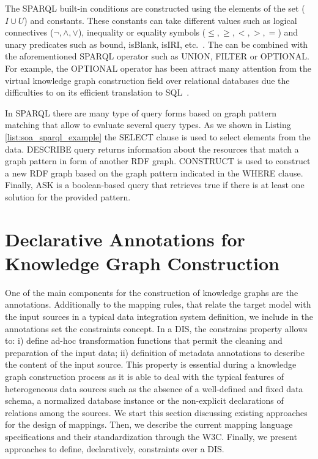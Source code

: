 \begin{table}[!ht]
\centering
\caption{Example of a SPARQL result-set}
\label{tab:soa_result_set}
\end{table}

The SPARQL built-in conditions are constructed using the elements of the set ($I \cup U$) and constants. These constants can take different values such as logical connectives ($\neg,\wedge,\vee $), inequality or equality symbols ($\leq,\geq,<,>,= $) and unary predicates such as bound, isBlank, isIRI, etc.~\citep{SPARQL}. The can be combined with the aforementioned SPARQL operator such as UNION, FILTER or OPTIONAL. For example, the OPTIONAL operator has been attract many attention from the virtual knowledge graph construction field over relational databases due the difficulties to on its efficient translation to SQL~\citep{xiao2018efficient}.

In SPARQL there are many type of query forms based on graph pattern matching that allow to evaluate several query types. As we shown in Listing \ref{list:soa_sparql_example} the SELECT clause is used to select elements from the data. DESCRIBE query returns information about the resources that match a graph pattern in form of another RDF graph. CONSTRUCT is used to construct a new RDF graph based on the graph pattern indicated in the WHERE clause. Finally, ASK is a boolean-based query that retrieves true if there is at least one solution for the provided pattern.

\section{Declarative Annotations for Knowledge Graph Construction}
\label{sec:soa_annotations}
One of the main components for the construction of knowledge graphs are the annotations. Additionally to the mapping rules, that relate the target model with the input sources in a typical data integration system definition, we include in the annotations set the constraints concept. In a DIS, the constrains property allows to: i) define ad-hoc transformation functions that permit the cleaning and preparation of the input data; ii) definition of metadata annotations to describe the content of the input source. This property is essential during a knowledge graph construction process as it is able to deal with the typical features of heterogeneous data sources such as the absence of a well-defined and fixed data schema, a normalized database instance or the non-explicit declarations of relations among the sources. We start this section discussing existing approaches for the design of mappings. Then, we describe the current mapping language specifications and their standardization through the W3C. Finally, we present approaches to define, declaratively, constraints over a DIS.

